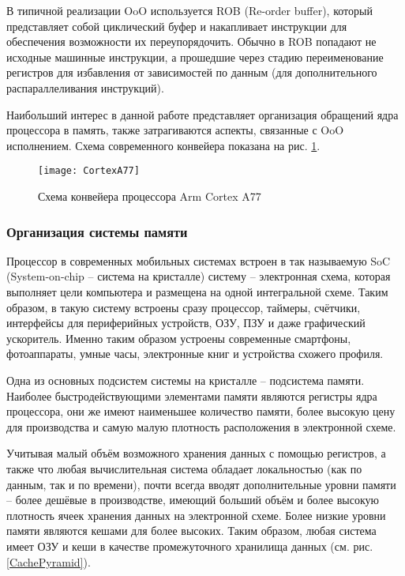     В типичной реализации OoO используется ROB (Re-order buffer), который представляет собой
    циклический буфер и накапливает инструкции для обеспечения возможности их переупорядочить.
    Обычно в ROB попадают не исходные машинные инструкции, а прошедшие через стадию переименование
    регистров для избавления от зависимостей по данным (для дополнительного распараллеливания
    инструкций).

    Наибольший интерес в данной работе представляет организация обращений ядра процессора в память,
    также затрагиваются аспекты, связанные с OoO исполнением. Схема современного конвейера показана на
    рис. \ref{cortexA77}.

    \begin{figure}[!h]
        \caption{Схема конвейера процессора Arm Cortex A77 \cite{CortexA77Docs}}
        \centering
        \texttt{[image: CortexA77]}
        \label{cortexA77}
    \end{figure}

\subsubsection{Организация системы памяти}

    Процессор в современных мобильных системах встроен в так называемую SoC (System-on-chip --
    система на кристалле) систему -- электронная схема, которая выполняет цели компьютера
    и размещена на одной интегральной схеме. Таким образом, в такую систему встроены сразу процессор,
    таймеры, счётчики, интерфейсы для периферийных устройств, ОЗУ, ПЗУ и даже графический ускоритель.
    Именно таким образом устроены современные смартфоны, фотоаппараты, умные часы, электронные книг
    и устройства схожего профиля.

    Одна из основных подсистем системы на кристалле -- подсистема памяти. Наиболее быстродействующими
    элементами памяти являются регистры ядра процессора, они же имеют наименьшее количество памяти,
    более высокую цену для производства и самую малую плотность расположения в электронной схеме.

    Учитывая малый объём возможного хранения данных с помощью регистров, а также
    что любая вычислительная система обладает локальностью (как по данным, так и по
    времени), почти всегда вводят дополнительные уровни памяти -- более дешёвые в производстве,
    имеющий больший объём и более высокую плотность ячеек хранения данных на электронной схеме.
    Более низкие уровни памяти являются кешами для более высоких.
    Таким образом, любая система имеет ОЗУ и кеши в качестве промежуточного хранилища данных
    (см. рис. \ref{CachePyramid}).

